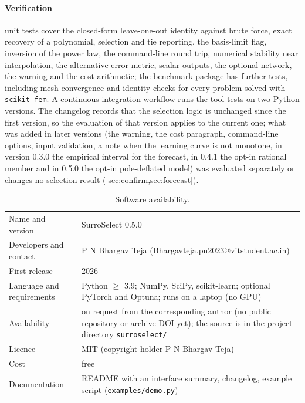 \paragraph{Verification} \NToolTests{} unit tests cover the closed-form leave-one-out identity against brute force, exact recovery of a polynomial, selection and tie reporting, the basis-limit flag, inversion of the power law, the command-line round trip, numerical stability near interpolation, the alternative error metric, scalar outputs, the optional network, the warning and the cost arithmetic; the benchmark package has \NBenchTests{} further tests, including mesh-convergence and identity checks for every problem solved with \texttt{scikit-fem}. A continuous-integration workflow runs the tool tests on two Python versions. The changelog records that the selection logic is unchanged since the first version, so the evaluation of that version applies to the current one; what was added in later versions (the warning, the cost paragraph, command-line options, input validation, a note when the learning curve is not monotone, in version 0.3.0 the empirical interval for the forecast, in 0.4.1 the opt-in rational member and in 0.5.0 the opt-in pole-deflated model) was evaluated separately or changes no selection result (\cref{sec:confirm,sec:forecast}).
\begin{table}[t]\centering\caption{Software availability.}\label{tab:softavail}\small
\begin{tabularx}{\textwidth}{lX}\toprule
Name and version & SurroSelect 0.5.0\\
Developers and contact & P N Bhargav Teja (Bhargavteja.pn2023@vitstudent.ac.in)\\
First release & 2026\\
Language and requirements & Python $\ge$ 3.9; NumPy, SciPy, scikit-learn; optional PyTorch and Optuna; runs on a laptop (no GPU)\\
Availability & on request from the corresponding author (no public repository or archive DOI yet); the source is in the project directory \texttt{surroselect/}\\
Licence & MIT (copyright holder P N Bhargav Teja)\\
Cost & free\\
Documentation & README with an interface summary, changelog, example script (\texttt{examples/demo.py})\\
\bottomrule\end{tabularx}\end{table}
